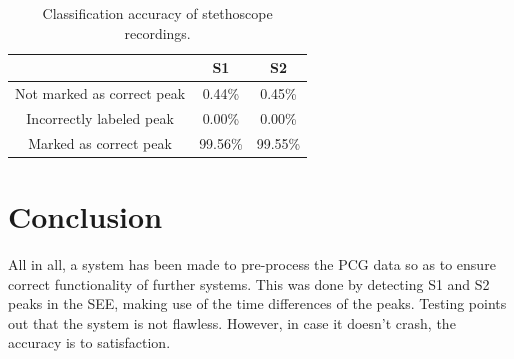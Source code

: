 \begin{table}[H]
\scriptsize
\centering
\captionsetup{justification=centering}
\begin{tabular}{|c|c|c|}
\hline
 & \textbf{S1} & \textbf{S2} \\
\hline
Not marked as correct peak & 0.44\% & 0.45\% \\
Incorrectly labeled peak & 0.00\% & 0.00\% \\
Marked as correct peak & 99.56\% & 99.55\% \\
\hline
\end{tabular}
\caption{Classification accuracy of stethoscope recordings.}
\label{tab:stethoscope_results}
\end{table}



\section{Conclusion}

All in all, a system has been made to pre-process the PCG data so as to ensure correct functionality of further systems. This was done by detecting S1 and S2 peaks in the SEE, making use of the time differences of the peaks. Testing points out that the system is not flawless. However, in case it doesn't crash, the accuracy is to satisfaction.

